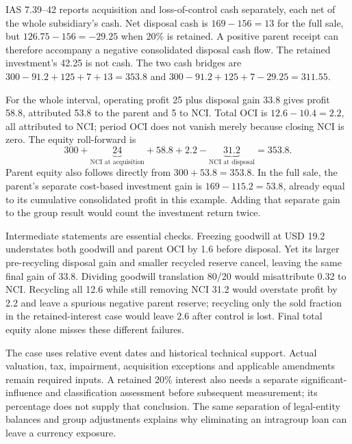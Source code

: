 IAS 7.39--42 reports acquisition and loss-of-control cash separately, each
net of the whole subsidiary's cash. Net disposal cash is \(169-156=13\)
for the full sale, but \(126.75-156=-29.25\) when 20\% is retained.
A positive parent receipt can therefore accompany a negative consolidated
disposal cash flow. The retained investment's 42.25 is not cash. The two
cash bridges are \(300-91.2+125+7+13=353.8\) and
\(300-91.2+125+7-29.25=311.55\).

For the whole interval, operating profit 25 plus disposal gain 33.8 gives
profit 58.8, attributed 53.8 to the parent and 5 to NCI. Total OCI is
\(12.6-10.4=2.2\), all attributed to NCI; period OCI does not vanish
merely because closing NCI is zero. The equity roll-forward is
\[
  300+\underbrace{24}_{\text{NCI at acquisition}}+58.8+2.2
      -\underbrace{31.2}_{\text{NCI at disposal}}=353.8.
\]
Parent equity also follows directly from \(300+53.8=353.8\). In the full
sale, the parent's separate cost-based investment gain is
\(169-115.2=53.8\), already equal to its cumulative consolidated profit
in this example. Adding that separate gain to the group result would count
the investment return twice.

Intermediate statements are essential checks. Freezing goodwill at USD 19.2
understates both goodwill and parent OCI by 1.6 before disposal. Yet its
larger pre-recycling disposal gain and smaller recycled reserve cancel,
leaving the same final gain of 33.8. Dividing goodwill translation 80/20
would misattribute 0.32 to NCI. Recycling all 12.6 while still removing NCI
31.2 would overstate profit by 2.2 and leave a spurious negative parent
reserve; recycling only the sold fraction in the retained-interest case
would leave 2.6 after control is lost. Final total equity alone misses these
different failures.

The case uses relative event dates and historical technical support. Actual
valuation, tax, impairment, acquisition exceptions and applicable amendments
remain required inputs. A retained 20\% interest also needs a separate
significant-influence and classification assessment before subsequent
measurement; its percentage does not supply that conclusion. The same
separation of legal-entity balances and group adjustments explains why
eliminating an intragroup loan can leave a currency exposure.
